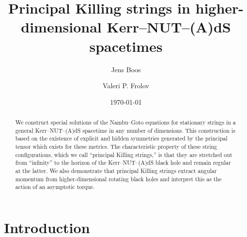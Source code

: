 \documentclass[superscriptaddress,twocolumn,showpacs,
preprintnumbers,amsmath,amssymb,nofootinbib,
longbibliography,aps,prd,10pt]{revtex4-1}
\begin{document}
\title{Principal Killing strings in higher-dimensional Kerr--NUT--(A)dS spacetimes}

\author{Jens Boos}


\author{Valeri P. Frolov}



\date{\today}

\begin{abstract}
We construct special solutions of the Nambu--Goto equations for stationary strings in a general Kerr--NUT--(A)dS spacetime in any number of dimensions. This construction is based on the existence of explicit and hidden symmetries generated by the principal tensor which exists for these metrics. The characteristic property of these string configurations, which we call ``principal Killing strings,'' is that they are stretched out from ``infinity'' to the horizon of the Kerr--NUT--(A)dS black hole and remain regular at the latter. We also demonstrate that principal Killing strings extract angular momentum from higher-dimensional rotating black holes and interpret this as the action of an asymptotic torque.
\end{abstract}



\maketitle

\section{Introduction}
\end{document}
